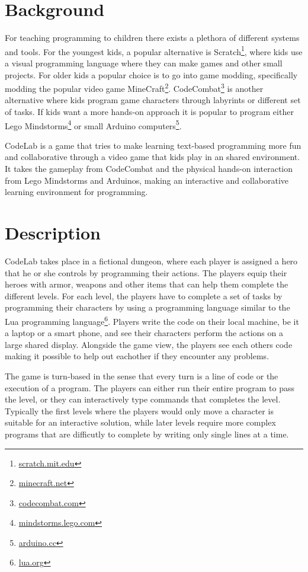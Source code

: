\documentclass[12pt,journal,compsoc]{IEEEtran}
\begin{document}
\section{Background} 
For teaching programming to children there exists a plethora of different
systems and tools. For the youngest kids, a popular alternative is
Scratch\footnote{\url{scratch.mit.edu}}, where kids use a visual programming
language where they can make games and other small projects.  For older kids a
popular choice is to go into game modding, specifically modding the popular
video game MineCraft\footnote{\url{minecraft.net}}.
CodeCombat\footnote{\url{codecombat.com}} is another alternative where kids
program game characters through labyrints or different set of tasks. If kids
want a more hands-on approach it is popular to program either Lego
Mindstorms\footnote{\url{mindstorms.lego.com}} or small Arduino
computers\footnote{\url{arduino.cc}}. 

CodeLab is a game that tries to make learning text-based programming more fun
and collaborative through a video game that kids play in an shared environment.
It takes the gameplay from CodeCombat and the physical hands-on interaction from
Lego Mindstorms and Arduinos, making an interactive and collaborative learning
environment for programming. 

\section{Description} 
CodeLab takes place in a fictional dungeon, where each player is assigned a
hero that he or she controls by programming their actions. The players equip
their heroes with armor, weapons and other items that can help them complete the
different levels. For each level, the players have to complete a set of tasks by
programming their characters by using a programming language similar to the 
Lua programming language\footnote{\url{lua.org}}. Players 
write the code on their local machine, be it a laptop or a smart phone, and see
their characters perform the actions on a large shared display. Alongside the
game view, the players see each others code making it possible to help out
eachother if they encounter any problems. 

The game is turn-based in the sense that every turn is a line of code or the
execution of a program. The players can either run their entire program to pass
the level, or they can interactively type commands that completes the level.
Typically the first levels where the players would only move a character is
suitable for an interactive solution, while later levels require more complex
programs that are difficutly to complete by writing only single lines at a time. 
\end{document}
